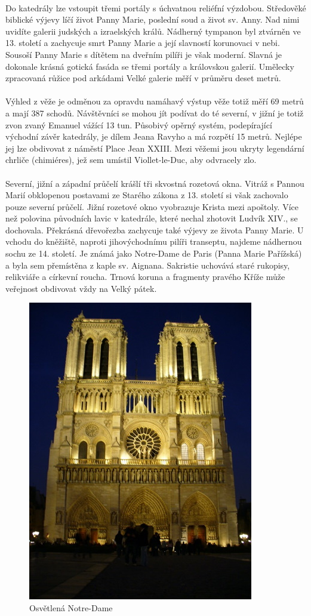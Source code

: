 \begin{figure}[h!]
\end{figure}\\Do katedrály lze vstoupit třemi portály s úchvatnou reliéfní výzdobou. Středověké biblické výjevy líčí život Panny Marie, poslední soud a život sv. Anny. Nad nimi uvidíte galerii judských a izraelských králů. Nádherný tympanon byl ztvárněn ve 13. století a zachycuje smrt Panny Marie a její slavností korunovaci v nebi. Sousoší Panny Marie s dítětem na dveřním pilíři je však moderní. Slavná je dokonale krásná gotická fasáda se třemi portály a královskou galerií. Umělecky zpracovaná růžice pod arkádami Velké galerie měří v průměru deset metrů.\\\\Výhled z věže je odměnou za opravdu namáhavý výstup   věže totiž měří 69 metrů a mají 387 schodů. Návštěvníci se mohou jít podívat do té severní, v jižní je totiž zvon zvaný Emanuel vážící 13 tun. Působivý opěrný systém, podepírající východní závěr katedrály, je dílem Jeana Ravyho a má rozpětí 15 metrů. Nejlépe jej lze obdivovat z náměstí Place Jean XXIII. Mezi věžemi jsou ukryty legendární chrliče (chimiéres), jež sem umístil Viollet-le-Duc, aby odvracely zlo.\\\\Severní, jižní a západní průčelí krášlí tři skvostná rozetová okna. Vitráž s Pannou Marií obklopenou postavami ze Starého zákona z 13. století si však zachovalo pouze severní průčelí. Jižní rozetové okno vyobrazuje Krista mezi apoštoly. Více než polovina původních lavic v katedrále, které nechal zhotovit Ludvík XIV., se dochovala. Překrásná dřevořezba zachycuje také výjevy ze života Panny Marie. U vchodu do kněžiště, naproti jihovýchodnímu pilíři transeptu, najdeme nádhernou sochu ze 14. století. Je známá jako Notre-Dame de Paris (Panna Marie Pařížská) a byla sem přemístěna z kaple sv. Aignana. Sakristie uchovává staré rukopisy, relikviáře a církevní roucha. Trnová koruna a fragmenty pravého Kříže může veřejnost obdivovat vždy na Velký pátek.\cite{pecinovsky}
\begin{figure}[h!]
\centering
\includegraphics[scale=0.5]{images/obr7N.jpg}
\caption{Osvětlená Notre-Dame}

\end{figure}
